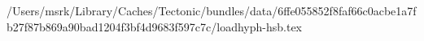 /Users/msrk/Library/Caches/Tectonic/bundles/data/6ffe055852f8faf66c0acbe1a7fb27f87b869a90bad1204f3bf4d9683f597c7c/loadhyph-hsb.tex